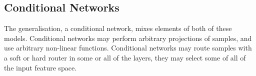 \documentclass[thesis]{subfiles}
\begin{document}
\subsection{Conditional Networks}
The generalisation, a conditional network, mixes elements of both of these models. Conditional networks may perform arbitrary projections of samples, and use arbitrary non-linear functions. Conditional networks may route samples with a soft or hard router in some or all of the layers, they may select some of all of the input feature space.
\end{document}
